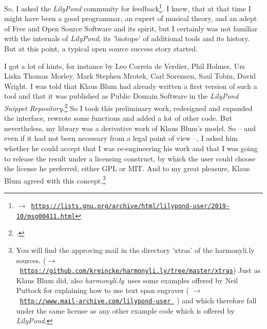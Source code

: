 \documentclass[
  DIV=calc,
  BCOR=5mm,
  12pt,
  headings=small,
  oneside,
  abstract=true,
  toc=bib,
  xcolor=dvipsnames,
  openany,
  ngerman,english]{scrartcl}
\newcommand{\acc}[0]{\textit}
\newcommand{\ra}[0]{$\rightarrow$}
\newcommand{\lnka}[1]{\href{#1}{\texttt{#1}}}
\newcommand{\hlyn}[0]{\textit{harmonyli.ly}}
\newcommand{\lily}[0]{\textit{LilyPond}}
\begin{document}
So, I asked the \acc{LilyPond} community for feedback\footnote{\ra\
\lnka{https://lists.gnu.org/archive/html/lilypond-user/2019-10/msg00411.html}}.
I knew, that at that time I might have been a good programmar, an expert of
musical theory, and an adept of Free and Open Source Software and its spirit,
but I certainly was not familiar with the internals of \acc{LilyPond}, its
'biotope' of additional tools and its history. But at this point, a typical open
source success story started.

I got a lot of hints, for instance by Leo Correia de Verdier, Phil Holmes, Urs
Liska Thomas Morley, Mark Stephen Mrotek, Carl Sorensen, Saul Tobin, David
Wright. I was told that Klaus Blum had already written a first version of such a
tool and that it was published as Public Domain Software in the \acc{LilyPond
Snippet Repository}.\footcite[cf.][\nopage wp]{Blum2019a} So I took this
preliminary work, redesigned and expanded the interface, rewrote some functions
and added a lot of other code. But nevertheless, my library was a derivative
work of Klaus Blum's model. So -- and even if it had not been necessary from a
legal point of view --, I asked him whether he could accept that I was
re-engineering his work and that I was going to release the result under a
licensing construct, by which the user could choose the license he preferred,
either GPL or MIT. And to my great pleasure, Klaus Blum agreed with this
concept.\footnote{You will find the approving mail in the directory 'xtras' of
the harmonyli.ly sources. (\ra\
\lnka{https://github.com/kreincke/harmonyli.ly/tree/master/xtras}) Just as Klaus
Blum did, also \hlyn\ uses some examples offered by Neil Puttock for explaining
how to use text span engraver ( \ra\
\lnka{http://www.mail-archive.com/lilypond-user%
} )
and which therefore fall under the same license as any other example code which
is offered by \lily. }
\end{document}
